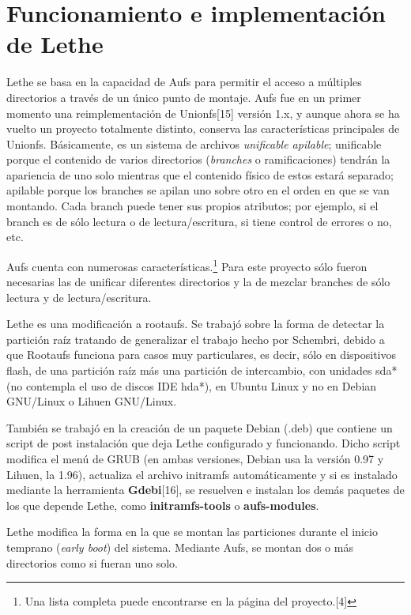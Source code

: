 \documentclass[final,narroweqnarray,inline,twoside]{ieee}
\newcommand{\itref}[1]{[{#1}]}
\begin{document}
\section{Funcionamiento e implementación de Lethe}
Lethe se basa en la capacidad de Aufs para permitir el acceso a múltiples directorios a través de un único punto de montaje. Aufs fue en un primer momento una reimplementación de Unionfs\itref{15} versión 1.x, y aunque ahora se ha vuelto un proyecto totalmente distinto, conserva las características principales de Unionfs. Básicamente, es un sistema de archivos \textit{unificable apilable}; unificable porque el contenido de varios directorios (\textit{branches} o ramificaciones) tendrán la apariencia de uno solo mientras que el contenido físico de estos estará separado; apilable porque los branches se apilan uno sobre otro en el orden en que se van montando. Cada branch puede tener sus propios atributos; por ejemplo, si el branch es de sólo lectura o de lectura/escritura, si tiene control de errores o no, etc.

Aufs cuenta con numerosas características.\footnote{Una lista completa puede encontrarse en la página del proyecto.\itref{4}} Para este proyecto sólo fueron necesarias las de unificar diferentes directorios y la de mezclar branches de sólo lectura y de lectura/escritura.

Lethe es una modificación a rootaufs. Se trabajó sobre la forma de detectar la partición raíz tratando de generalizar el trabajo hecho por Schembri, debido a que Rootaufs funciona para casos muy particulares, es decir, sólo en dispositivos flash, de una partición raíz más una partición de intercambio, con unidades sda* (no contempla el uso de discos IDE hda*), en Ubuntu Linux y no en Debian GNU/Linux o Lihuen GNU/Linux.

También se trabajó en la creación de un paquete Debian (.deb) que contiene un script de post instalación que deja Lethe configurado y funcionando. Dicho script modifica el menú de GRUB (en ambas versiones, Debian usa la versión 0.97 y Lihuen, la 1.96), actualiza el archivo initramfs automáticamente y si es instalado mediante la herramienta \textbf{Gdebi}\itref{16}, se resuelven e instalan los demás paquetes de los que depende Lethe, como \textbf{initramfs-tools} o \textbf{aufs-modules}.

Lethe modifica la forma en la que se montan las particiones durante el inicio temprano (\textit{early boot}) del sistema. Mediante Aufs, se montan dos o más directorios como si fueran uno solo.
\end{document}
